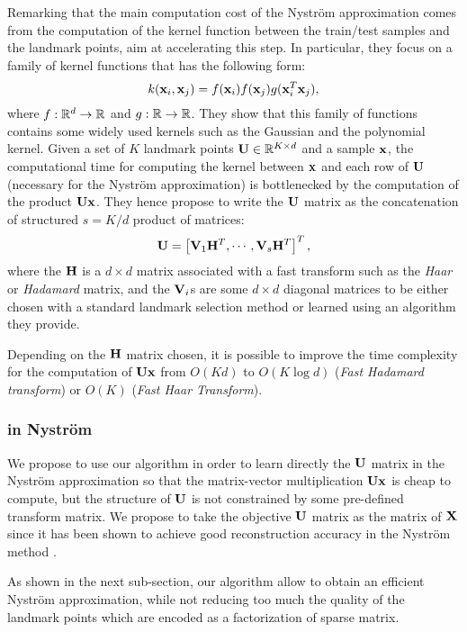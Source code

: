 Remarking that the main computation cost of the Nyström approximation comes from the computation of the kernel function between the train/test samples and the landmark points, \cite{si2016computationally} aim at accelerating this step. In particular, they focus on a family of kernel functions that has the following form:
%
\begin{equation}
 k({\mathbf{x}}_i, {\mathbf{x}}_j) = f({\mathbf{x}}_i) f({\mathbf{x}}_j) g({\mathbf{x}}_i^T{\mathbf{x}}_j),
\end{equation}
%
where $f: \mathbb{R}^d \rightarrow \mathbb{R}$ and $g: \mathbb{R} \rightarrow \mathbb{R}$. They show that this family of functions contains some widely used kernels such as the Gaussian and the polynomial kernel. Given a set of $K$ landmark points ${\mathbf{U}} \in \mathbb{R}^{K \times d}$ and a sample ${\mathbf{x}}$, the computational time for computing the kernel between ${\mathbf{x}}$ and each row of ${\mathbf{U}}$ (necessary for the Nyström approximation) is bottlenecked by the computation of the product ${\mathbf{U}}{\mathbf{x}}$. They hence propose to write the ${\mathbf{U}}$ matrix as the concatenation of structured $s = K / d$ product of matrices:
%
\begin{equation}
 {\mathbf{U}} = \left[ {\mathbf{V}}_1 {\mathbf{H}}^T, \cdots, {\mathbf{V}}_s{\mathbf{H}}^T  \right]^T,
\end{equation}
%
where the ${\mathbf{H}}$ is a $d \times d$ matrix associated with a fast transform such as the \textit{Haar} or \textit{Hadamard} matrix, and the ${\mathbf{V}}_i$s are some $d \times d$ diagonal matrices to be either chosen with a standard landmark selection method or learned using an algorithm they provide.

Depending on the ${\mathbf{H}}$ matrix chosen, it is possible to improve the time complexity for the computation of ${\mathbf{U}}{\mathbf{x}}$ from $O(Kd)$ to $O(K \log{d})$ (\textit{Fast Hadamard transform}) or $O(K)$ (\textit{Fast Haar Transform}).

\subsubsection{\qkmeans in Nyström}

We propose to use our \qkmeans algorithm in order to learn directly the ${\mathbf{U}}$ matrix in the Nyström approximation so that the matrix-vector multiplication ${\mathbf{U}} {\mathbf{x}}$ is cheap to compute, but the structure of ${\mathbf{U}}$ is not constrained by some pre-defined transform matrix. We propose to take the objective ${\mathbf{U}}$ matrix as the \kmeans matrix of ${\mathbf{X}}$ since it has been shown to achieve good reconstruction accuracy in the Nyström method \cite{kumar2012sampling}.

As shown in the next sub-section, our algorithm allow to obtain an efficient Nyström approximation, while not reducing too much the quality of the \kmeans landmark points which are encoded as a factorization of sparse matrix. 

